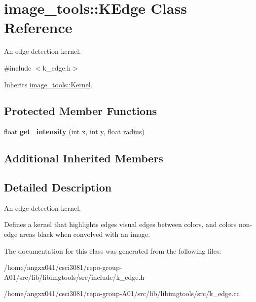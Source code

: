 \hypertarget{classimage__tools_1_1KEdge}{}\section{image\+\_\+tools\+:\+:K\+Edge Class Reference}
\label{classimage__tools_1_1KEdge}


An edge detection kernel.  




{\ttfamily \#include $<$k\+\_\+edge.\+h$>$}



Inherits \hyperlink{classimage__tools_1_1Kernel}{image\+\_\+tools\+::\+Kernel}.

\subsection*{Protected Member Functions}
\begin{DoxyCompactItemize}
\item 
float {\bfseries get\+\_\+intensity} (int x, int y, float \hyperlink{classimage__tools_1_1Kernel_ac834d16a242dd4a15f5f5e4a6dacea01}{radius})\hypertarget{classimage__tools_1_1KEdge_ac980938c27aeb2ea927fd7847dd5b020}{}\label{classimage__tools_1_1KEdge_ac980938c27aeb2ea927fd7847dd5b020}

\end{DoxyCompactItemize}
\subsection*{Additional Inherited Members}


\subsection{Detailed Description}
An edge detection kernel. 

Defines a kernel that highlights edges visual edges between colors, and colors non-\/edge areas black when convolved with an image. 

The documentation for this class was generated from the following files\+:\begin{DoxyCompactItemize}
\item 
/home/angxx041/csci3081/repo-\/group-\/\+A01/src/lib/libimgtools/src/include/k\+\_\+edge.\+h\item 
/home/angxx041/csci3081/repo-\/group-\/\+A01/src/lib/libimgtools/src/k\+\_\+edge.\+cc\end{DoxyCompactItemize}
